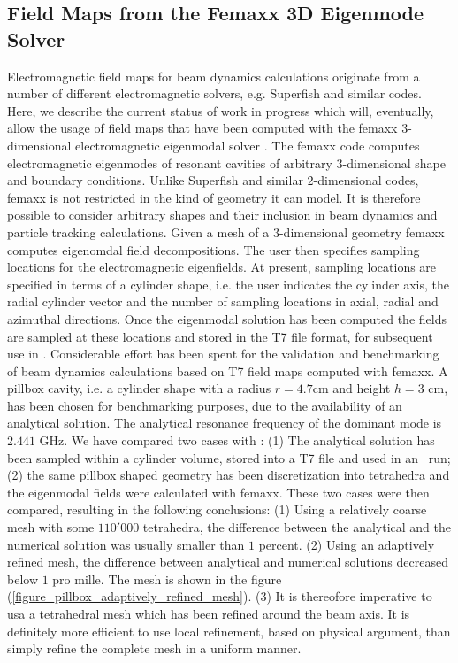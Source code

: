 \subsection{Field Maps from the Femaxx 3D Eigenmode Solver}

Electromagnetic field maps for beam dynamics calculations originate from a number of different
electromagnetic solvers, e.g. Superfish and similar codes.
Here, we describe the current status of work in progress which will, eventually,
allow the usage of field maps that have been computed with the femaxx $3$-dimensional
electromagnetic eigenmodal solver \cite{bib:arbenzetal2001,bib:arbenzetal2006}.
The femaxx code computes electromagnetic eigenmodes of resonant cavities of
arbitrary $3$-dimensional shape and boundary conditions.
Unlike Superfish and similar $2$-dimensional codes, femaxx is not restricted in the
kind of geometry it can model. It is therefore possible to consider arbitrary
shapes and their inclusion in beam dynamics and particle tracking calculations.
Given a mesh of a $3$-dimensional geometry femaxx computes eigenomdal field
decompositions.
The user then specifies sampling locations for the electromagnetic eigenfields.
At present, sampling locations are specified in terms of a cylinder shape,
i.e. the user indicates the cylinder axis, the radial cylinder vector and 
the number of sampling locations in axial, radial and azimuthal directions.
Once the eigenmodal solution has been computed the fields are sampled at
these locations and stored in the T7 file format, for subsequent use in \opal.
Considerable effort has been spent for the validation and benchmarking of
beam dynamics calculations based on T7 field maps computed with femaxx.
A pillbox cavity, i.e. a cylinder shape with a radius $r = 4.7$cm and
height $h = 3$ cm, has been chosen for benchmarking purposes,
due to the availability of an analytical solution.
The analytical resonance frequency of the dominant mode is $2.441$ GHz.
We have compared two cases with \opal: (1) The analytical solution has been
sampled within a cylinder volume, stored into a T7 file and used in an \opal\
run; (2) the same pillbox shaped geometry has been discretization into tetrahedra
and the eigenmodal fields were calculated with femaxx.
These two cases were then compared, resulting in the following conclusions:
(1) Using a relatively coarse mesh with some $110'000$ tetrahedra, the difference
between the analytical and the numerical solution was usually smaller than
$1$ percent.
(2) Using an adaptively refined mesh, the difference between analytical and
numerical solutions decreased below $1$ pro mille. The mesh is shown
in the figure (\ref{figure_pillbox_adaptively_refined_mesh}).
(3) It is thereofore imperative to usa a tetrahedral mesh which has been
refined around the beam axis. It is definitely more efficient to use local
refinement, based on physical argument, than simply refine the complete
mesh in a uniform manner.


